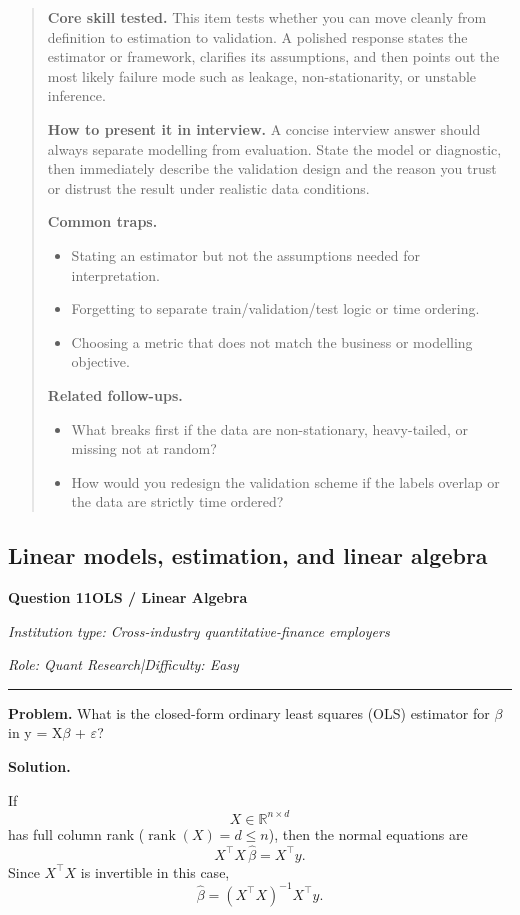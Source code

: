 \documentclass[11pt,letterpaper,openany]{book}
\newenvironment{EditorialNote}
  {\begin{quote}\small\setlength{\parskip}{0.25em}}
  {\end{quote}}
\newcommand{\QuestionSpacer}{\vspace{0.4em}}
\newcommand{\InterviewQuestionHeader}[5]{%
  \vspace{1.0em}%
  {\large\bfseries #1\enspace #4\par}%
  {\small\itshape Institution type: #2\par}%
  {\small\itshape Role: #3\enspace |\enspace Difficulty: #5\par}%
  \vspace{0.25em}\hrule\vspace{0.45em}%
}
\begin{document}
\begin{EditorialNote}


\textbf{Core skill tested.} This item tests whether you can move cleanly from definition to estimation to validation. A polished response states the estimator or framework, clarifies its assumptions, and then points out the most likely failure mode such as leakage, non-stationarity, or unstable inference.

\textbf{How to present it in interview.} A concise interview answer should always separate modelling from evaluation. State the model or diagnostic, then immediately describe the validation design and the reason you trust or distrust the result under realistic data conditions.

\textbf{Common traps.}
\begin{itemize}
\item Stating an estimator but not the assumptions needed for interpretation.
\item Forgetting to separate train/validation/test logic or time ordering.
\item Choosing a metric that does not match the business or modelling objective.
\end{itemize}

\textbf{Related follow-ups.}
\begin{itemize}
\item What breaks first if the data are non-stationary, heavy-tailed, or missing not at random?
\item How would you redesign the validation scheme if the labels overlap or the data are strictly time ordered?
\end{itemize}


\end{EditorialNote}
\QuestionSpacer

\subsection{Linear models, estimation, and linear algebra}

\InterviewQuestionHeader{Question 11}{Cross-industry quantitative-finance employers}{Quant Research}{OLS / Linear Algebra}{Easy}
\textbf{Problem.} What is the closed-form ordinary least squares (OLS) estimator for \ensuremath{\beta} in y = X\ensuremath{\beta} + \ensuremath{\varepsilon}?

\textbf{Solution.}

If
\[
X \in \mathbb{R}^{n\times d}
\]
has full column rank (\(\operatorname{rank}(X)=d\le n\)), then the normal equations are
\[
X^\top X\,\hat{\beta}=X^\top y.
\]
Since \(X^\top X\) is invertible in this case,
\[
\hat{\beta}=(X^\top X)^{-1}X^\top y.
\]
\end{document}
